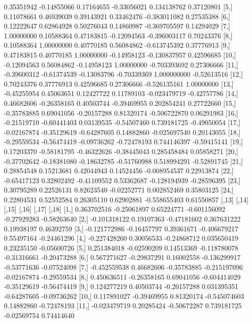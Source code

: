 \documentclass[a4paper, 12pt]{article}
\begin{document}
\begin{Schunk}
\begin{Soutput}
 [4,]  0.35351942 -0.14855066  0.17164655 -0.33056021  0.134138762  0.37120801
 [5,]  0.11078661  0.46939039  0.39143921  0.33462476 -0.383011082  0.27535388
 [6,]  0.12222647  0.62864928  0.50276043  0.14860987 -0.369705597  0.14294029
 [7,]  1.00000000  0.10588364  0.47183815 -0.12094563 -0.396003117  0.70243376
 [8,]  0.10588364  1.00000000  0.40770185  0.56084862 -0.613745392  0.37776913
 [9,]  0.47183815  0.40770185  1.00000000 -0.14958123 -0.130837957  0.42596685
[10,] -0.12094563  0.56084862 -0.14958123  1.00000000 -0.703393692  0.27306666
[11,] -0.39600312 -0.61374539 -0.13083796 -0.70339369  1.000000000 -0.52613516
[12,]  0.70243376  0.37776913  0.42596685  0.27306666 -0.526135161  1.00000000
[13,] -0.45255954  0.45063651  0.12427722  0.11789103 -0.023479719 -0.42757786
[14,]  0.46682606 -0.26358165  0.40503744 -0.39469955  0.202854241  0.27722660
[15,] -0.35783885  0.69041056 -0.20157288  0.81320174 -0.506722870  0.06291983
[16,] -0.21519710 -0.60441403  0.03139535 -0.54507460  0.739181725 -0.49050054
[17,] -0.02167874 -0.35129619 -0.64287605  0.14882860 -0.025697540  0.20143055
[18,] -0.29559534 -0.56474419 -0.09736262 -0.72478193  0.744146397 -0.59415141
[19,]  0.17203370 -0.58181795 -0.46322626 -0.38445043  0.285458484  0.05858271
[20,] -0.37702642 -0.18381080 -0.18632785 -0.51760988  0.518994291 -0.52891745
[21,]  0.28854548  0.15213681  0.42044943  0.14524456 -0.008954537  0.22913874
[22,] -0.65417123  0.32802492 -0.41109552  0.53362687 -0.128194939 -0.28596395
[23,]  0.30795289  0.22526131  0.82623540 -0.02252771  0.002852469  0.35803125
[24,]  0.22804531  0.52552584  0.26305110  0.62902881 -0.558655403  0.61550857
             [,13]       [,14]       [,15]        [,16]       [,17]       [,18]
 [1,]  0.363702516 -0.25061897  0.65224771 -0.601156092 -0.27929283 -0.58263640
 [2,] -0.101318122  0.19107363 -0.47181602  0.367631222  0.19938197  0.46392759
 [3,] -0.121772986 -0.16457797  0.39361671 -0.406679217  0.55497164 -0.24461296
 [4,] -0.227428260  0.30056533 -0.24868712  0.035650419  0.23235150 -0.05600726
 [5,]  0.251384018 -0.02590209  0.14513369 -0.118780078 -0.31316661 -0.20473288
 [6,]  0.567271627 -0.29837291  0.16002558 -0.136299917 -0.53771636 -0.07524098
 [7,] -0.452559538  0.46682606 -0.35783885 -0.215197096 -0.02167874 -0.29559534
 [8,]  0.450636511 -0.26358165  0.69041056 -0.604414029 -0.35129619 -0.56474419
 [9,]  0.124277219  0.40503744 -0.20157288  0.031395351 -0.64287605 -0.09736262
[10,]  0.117891027 -0.39469955  0.81320174 -0.545074603  0.14882860 -0.72478193
[11,] -0.023479719  0.20285424 -0.50672287  0.739181725 -0.02569754  0.74414640

\end{Soutput}
\end{Schunk}
\end{document}
